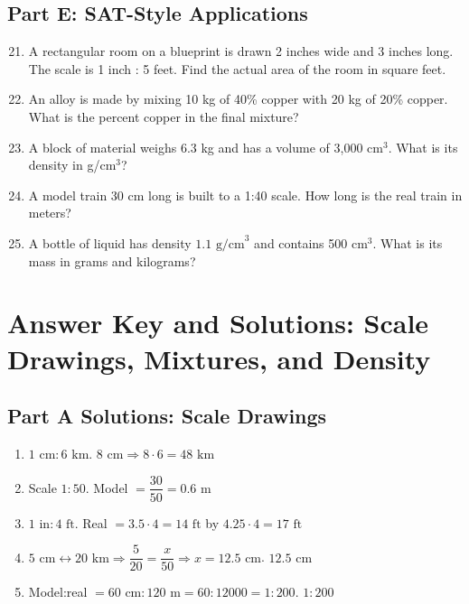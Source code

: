 \documentclass[14pt]{extarticle}
\begin{document}
\subsection*{Part E: SAT-Style Applications}
\begin{enumerate}
  \setcounter{enumi}{20}
  \item A rectangular room on a blueprint is drawn 2 inches wide and 3 inches long. The scale is 1 inch : 5 feet. Find the actual area of the room in square feet.
  \item An alloy is made by mixing 10 kg of 40\% copper with 20 kg of 20\% copper. What is the percent copper in the final mixture?
  \item A block of material weighs 6.3 kg and has a volume of 3,000 cm\(^3\). What is its density in g/cm\(^3\)?
  \item A model train 30 cm long is built to a 1:40 scale. How long is the real train in meters?
  \item A bottle of liquid has density \(1.1\text{ g/cm}^3\) and contains 500 cm\(^3\). What is its mass in grams and kilograms?
\end{enumerate}

\newpage


\section*{Answer Key and Solutions: Scale Drawings, Mixtures, and Density}

\subsection*{Part A Solutions: Scale Drawings}
\begin{enumerate}
  \item \(1\text{ cm}:6\text{ km}\). \(8\text{ cm}\Rightarrow 8\cdot6=\boxed{48\text{ km}}\)
  \item Scale \(1:50\). Model \(=\dfrac{30}{50}=\boxed{0.6\text{ m}}\)
  \item \(1\text{ in}:4\text{ ft}\). Real \(=3.5\cdot4= \boxed{14\text{ ft}}\) by \(4.25\cdot4=\boxed{17\text{ ft}}\)
  \item \(5\text{ cm}\leftrightarrow 20\text{ km}\Rightarrow \dfrac{5}{20}=\dfrac{x}{50}\Rightarrow x=12.5\text{ cm}\). \(\boxed{12.5\text{ cm}}\)
  \item Model:real \(=60\text{ cm}:120\text{ m}=60:12000=1:200\). \(\boxed{1:200}\)
\end{enumerate}
\end{document}
